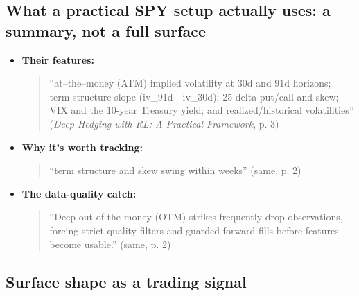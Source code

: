 \documentclass{article}
\begin{document}
\subsection{What a practical SPY setup actually uses: a summary, not a full surface}

\begin{itemize}

\item \textbf{Their features:}

\begin{quote}``at--the--money (ATM) implied volatility at 30d and 91d horizons; term-structure slope (iv\_91d - iv\_30d); 25-delta put/\allowbreak{}call and skew; VIX and the 10-year Treasury yield; and realized/\allowbreak{}historical volatilities'' (\emph{Deep Hedging with RL: A Practical Framework}, p. 3)\end{quote}

\item \textbf{Why it's worth tracking:}

\begin{quote}``term structure and skew swing within weeks'' (same, p. 2)\end{quote}

\item \textbf{The data-quality catch:}

\begin{quote}``Deep out-of-the-money (OTM) strikes frequently drop observations, forcing strict quality filters and guarded forward-fills before features become usable.'' (same, p. 2)\end{quote}

\end{itemize}

\subsection{Surface shape as a trading signal}
\end{document}
